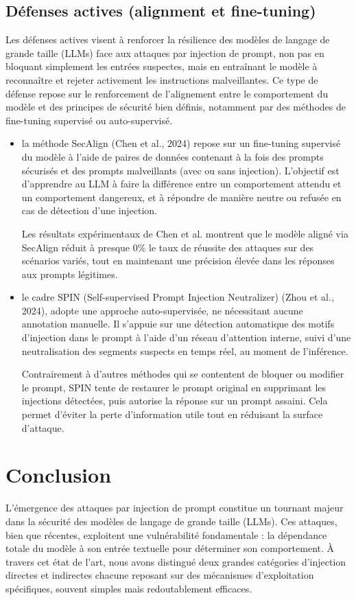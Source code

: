 	\subsection{Défenses actives (alignment et fine-tuning)}
		Les défenses actives visent à renforcer la résilience des modèles de langage de grande taille (LLMs) face aux attaques par injection de prompt, non pas en bloquant simplement les entrées suspectes, mais en entraînant le modèle à reconnaître et rejeter activement les instructions malveillantes. Ce type de défense repose sur le renforcement de l’alignement entre le comportement du modèle et des principes de sécurité bien définis, notamment par des méthodes de fine-tuning supervisé ou auto-supervisé.
		\begin{itemize}
			\item la méthode SecAlign (Chen et al., 2024) repose sur un fine-tuning supervisé du modèle à l’aide de paires de données contenant à la fois des prompts sécurisés et des prompts malveillants (avec ou sans injection). L’objectif est d’apprendre au LLM à faire la différence entre un comportement attendu et un comportement dangereux, et à répondre de manière neutre ou refusée en cas de détection d’une injection.
			
			Les résultats expérimentaux de Chen et al. montrent que le modèle aligné via SecAlign réduit à presque 0\% le taux de réussite des attaques sur des scénarios variés, tout en maintenant une précision élevée dans les réponses aux prompts légitimes\cite{chen_secalign_2025}.
			\item le cadre SPIN (Self-supervised Prompt Injection Neutralizer) (Zhou et al., 2024), adopte une approche auto-supervisée, ne nécessitant aucune annotation manuelle. Il s’appuie sur une détection automatique des motifs d’injection dans le prompt à l’aide d’un réseau d’attention interne, suivi d’une neutralisation des segments suspects en temps réel, au moment de l’inférence\cite{zhou_spin_2024}.
			
			Contrairement à d'autres méthodes qui se contentent de bloquer ou modifier le prompt, SPIN tente de restaurer le prompt original en supprimant les injections détectées, puis autorise la réponse sur un prompt assaini. Cela permet d’éviter la perte d’information utile tout en réduisant la surface d’attaque.
		\end{itemize}
		
\section*{Conclusion}
	L’émergence des attaques par injection de prompt constitue un tournant majeur dans la sécurité des modèles de langage de grande taille (LLMs). Ces attaques, bien que récentes, exploitent une vulnérabilité fondamentale : la dépendance totale du modèle à son entrée textuelle pour déterminer son comportement. À travers cet état de l’art, nous avons distingué deux grandes catégories d’injection directes et indirectes chacune reposant sur des mécanismes d’exploitation spécifiques, souvent simples mais redoutablement efficaces.
	

